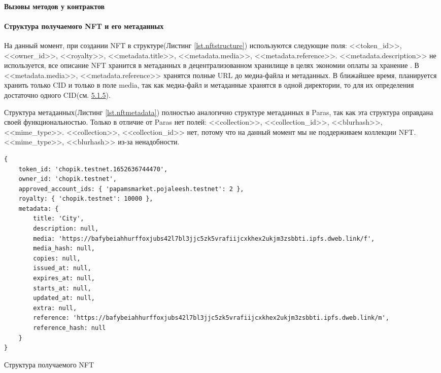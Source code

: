 \paragraph{Вызовы методов у контрактов}

\paragraph{Структура получаемого NFT и его метаданных}
\label{section.5.1.4}
На данный момент, при создании NFT в структуре(Листинг {\color{blue}\ref{lst.nftstructure}}) используются следующие поля: <<token\_id>>, <<owner\_id>>, <<royalty>>, <<metadata.title>>, <<metadata.media>>, <<metadata.reference>>. <<metadata.description>> не используется, все описание NFT хранится в метаданных в децентрализованном хранилище в целях экономии оплаты за хранение . В <<metadata.media>>, <<metadata.reference>> хранятся полные URL до медиа-файла и метаданных. В ближайшее время, планируется хранить только CID и только в поле media, так как медиа-файл и метаданные хранятся в одной директории, то для их определения достаточно одного CID(см. \hyperref[section.5.1.5]{\color{blue} 5.1.5}).

Структура метаданных(Листинг {\color{blue}\ref{lst.nftmetadata}}) полностью аналогично структуре метаданных в Paras, так как эта структура оправдана своей функциональностью. Только в отличие от Paras нет полей: <<collection>>, <<collection\_id>>, <<blurhash>>, <<mime\_type>>. <<collection>>, <<collection\_id>> нет, потому что на данный момент мы не поддерживаем коллекции NFT. <<mime\_type>>, <<blurhash>> из-за ненадобности.

\begin{listing}
\begin{verbatim}
{
    token_id: 'chopik.testnet.1652636744470',
    owner_id: 'chopik.testnet',
    approved_account_ids: { 'papamsmarket.pojaleesh.testnet': 2 },
    royalty: { 'chopik.testnet': 10000 },
    metadata: {
        title: 'City',
        description: null,
        media: 'https://bafybeiahhurffoxjubs42l7bl3jjc5zk5vrafiijcxkhex2ukjm3zsbbti.ipfs.dweb.link/f',
        media_hash: null,
        copies: null,
        issued_at: null,
        expires_at: null,
        starts_at: null,
        updated_at: null,
        extra: null,
        reference: 'https://bafybeiahhurffoxjubs42l7bl3jjc5zk5vrafiijcxkhex2ukjm3zsbbti.ipfs.dweb.link/m',
        reference_hash: null
    }
}
\end{verbatim}
\caption{Структура получаемого NFT}
\label{lst.nftstructure}
\end{listing}

